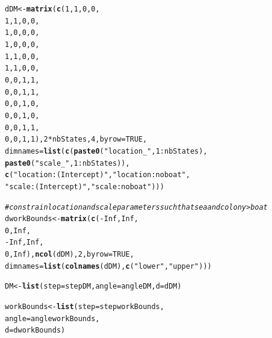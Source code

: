 \documentclass[12pt]{article}\usepackage[]{graphicx}\usepackage[]{xcolor}
\makeatletter
\newcommand{\hlnum}[1]{\textcolor[rgb]{0.686,0.059,0.569}{#1}}%
\newcommand{\hlsng}[1]{\textcolor[rgb]{0.192,0.494,0.8}{#1}}%
\newcommand{\hlcom}[1]{\textcolor[rgb]{0.678,0.584,0.686}{\textit{#1}}}%
\newcommand{\hlopt}[1]{\textcolor[rgb]{0,0,0}{#1}}%
\newcommand{\hldef}[1]{\textcolor[rgb]{0.345,0.345,0.345}{#1}}%
\newcommand{\hlkwb}[1]{\textcolor[rgb]{0.69,0.353,0.396}{#1}}%
\newcommand{\hlkwc}[1]{\textcolor[rgb]{0.333,0.667,0.333}{#1}}%
\newcommand{\hlkwd}[1]{\textcolor[rgb]{0.737,0.353,0.396}{\textbf{#1}}}%
\newenvironment{kframe}{%
 \def\at@end@of@kframe{}%
 \ifinner\ifhmode%
  \def\at@end@of@kframe{\end{minipage}}%
  \begin{minipage}{\columnwidth}%
 \fi\fi%
 \def\FrameCommand##1{\hskip\@totalleftmargin \hskip-\fboxsep
 \colorbox{shadecolor}{##1}\hskip-\fboxsep
     \hskip-\linewidth \hskip-\@totalleftmargin \hskip\columnwidth}%
 \MakeFramed {\advance\hsize-\width
   \@totalleftmargin\z@ \linewidth\hsize
   \@setminipage}}%
 {\par\unskip\endMakeFramed%
 \at@end@of@kframe}
\newenvironment{knitrout}{}{} %
\makeatother
\begin{document}
\begin{knitrout}
\begin{kframe}
\begin{alltt}
\hldef{dDM} \hlkwb{<-} \hlkwd{matrix}\hldef{(}\hlkwd{c}\hldef{(}\hlnum{1}\hldef{,}\hlnum{1}\hldef{,}\hlnum{0}\hldef{,}\hlnum{0}\hldef{,}
                \hlnum{1}\hldef{,}\hlnum{1}\hldef{,}\hlnum{0}\hldef{,}\hlnum{0}\hldef{,}
                \hlnum{1}\hldef{,}\hlnum{0}\hldef{,}\hlnum{0}\hldef{,}\hlnum{0}\hldef{,}
                \hlnum{1}\hldef{,}\hlnum{0}\hldef{,}\hlnum{0}\hldef{,}\hlnum{0}\hldef{,}
                \hlnum{1}\hldef{,}\hlnum{1}\hldef{,}\hlnum{0}\hldef{,}\hlnum{0}\hldef{,}
                \hlnum{1}\hldef{,}\hlnum{1}\hldef{,}\hlnum{0}\hldef{,}\hlnum{0}\hldef{,}
                \hlnum{0}\hldef{,}\hlnum{0}\hldef{,}\hlnum{1}\hldef{,}\hlnum{1}\hldef{,}
                \hlnum{0}\hldef{,}\hlnum{0}\hldef{,}\hlnum{1}\hldef{,}\hlnum{1}\hldef{,}
                \hlnum{0}\hldef{,}\hlnum{0}\hldef{,}\hlnum{1}\hldef{,}\hlnum{0}\hldef{,}
                \hlnum{0}\hldef{,}\hlnum{0}\hldef{,}\hlnum{1}\hldef{,}\hlnum{0}\hldef{,}
                \hlnum{0}\hldef{,}\hlnum{0}\hldef{,}\hlnum{1}\hldef{,}\hlnum{1}\hldef{,}
                \hlnum{0}\hldef{,}\hlnum{0}\hldef{,}\hlnum{1}\hldef{,}\hlnum{1}\hldef{),}\hlnum{2}\hlopt{*}\hldef{nbStates,}\hlnum{4}\hldef{,}\hlkwc{byrow}\hldef{=}\hlnum{TRUE}\hldef{,}
              \hlkwc{dimnames}\hldef{=}\hlkwd{list}\hldef{(}\hlkwd{c}\hldef{(}\hlkwd{paste0}\hldef{(}\hlsng{"location_"}\hldef{,}\hlnum{1}\hlopt{:}\hldef{nbStates),}
                              \hlkwd{paste0}\hldef{(}\hlsng{"scale_"}\hldef{,}\hlnum{1}\hlopt{:}\hldef{nbStates)),}
                            \hlkwd{c}\hldef{(}\hlsng{"location:(Intercept)"}\hldef{,}\hlsng{"location:noboat"}\hldef{,}
                              \hlsng{"scale:(Intercept)"}\hldef{,}\hlsng{"scale:noboat"}\hldef{)))}

\hlcom{# constrain location and scale parameters such that sea and colony > boat}
\hldef{dworkBounds} \hlkwb{<-} \hlkwd{matrix}\hldef{(}\hlkwd{c}\hldef{(}\hlopt{-}\hlnum{Inf}\hldef{,}\hlnum{Inf}\hldef{,}
                        \hlnum{0}\hldef{,}\hlnum{Inf}\hldef{,}
                        \hlopt{-}\hlnum{Inf}\hldef{,}\hlnum{Inf}\hldef{,}
                        \hlnum{0}\hldef{,}\hlnum{Inf}\hldef{),}\hlkwd{ncol}\hldef{(dDM),}\hlnum{2}\hldef{,}\hlkwc{byrow}\hldef{=}\hlnum{TRUE}\hldef{,}
                      \hlkwc{dimnames}\hldef{=}\hlkwd{list}\hldef{(}\hlkwd{colnames}\hldef{(dDM),}\hlkwd{c}\hldef{(}\hlsng{"lower"}\hldef{,}\hlsng{"upper"}\hldef{)))}

\hldef{DM} \hlkwb{<-} \hlkwd{list}\hldef{(}\hlkwc{step} \hldef{= stepDM,} \hlkwc{angle} \hldef{= angleDM,} \hlkwc{d} \hldef{= dDM)}

\hldef{workBounds} \hlkwb{<-} \hlkwd{list}\hldef{(}\hlkwc{step} \hldef{= stepworkBounds,}
                   \hlkwc{angle} \hldef{= angleworkBounds,}
                   \hlkwc{d} \hldef{= dworkBounds)}
\end{alltt}
\end{kframe}
\end{knitrout}
\end{document}
